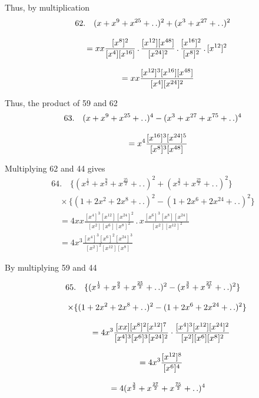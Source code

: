 Thus, by multiplication
\[
\begin{gathered}
62.\quad{}
(x+x^9+x^{25}+\mathinner{.\,.})^2+(x^3+x^{27}+ .\,. )^2\\[8pt]
\quad=xx\frac{[x^8]^2}{[x^4][x^{16}]}\,.\,\frac{[x^{12}][x^{48}]}{[x^{24}]^2}\,.\,\frac{[x^{16}]^2}{[x^8]^2}\,.\,[x^{12}]^2
\\[8pt]\quad{}=xx\frac{[x^{12}]^3[x^{16}][x^{48}]}{[x^4][x^{24}]^2}
\end{gathered}
\]


Thus, the product of 59 and 62
\[
\begin{gathered}63.\quad{}
(x+x^9+x^{25}+\mathinner{.\,.})^4-(x^3+x^{27}+x^{75}+\mathinner{.\,.})^4
\\[8pt]\quad{}=x^4\frac{[x^{16}]^3[x^{24}]^5}{[x^8]^3[x^{48}]}\end{gathered}
\]


Multiplying 62 and 44 gives
\[
\begin{gathered}
64.\quad{}
\{(x^{\frac12}+x^{\frac92}+x^{\frac{25}2}+ .\,. )^2+(x^{\frac32}+x^{\frac{27}2}+ .\,. )^2\}\\[8pt]
\quad\times\{(1+2x^2+2x^8+ .\,. )^2-(1+2x^6+2x^{24}+ .\,. )^2\}\\[8pt]
\quad=4xx\frac{[x^4]^3[x^{12}][x^{24}]^2}{[x^2][x^6][x^8]^2}\,.\,x\frac{[x^6]^3[x^8][x^{24}]}{[x^2][x^{12}]^2}
\\[8pt]\quad{}=4x^3\frac{[x^4]^3[x^6]^2[x^{24}]^3}{[x^2]^2[x^{12}][x^8]}
\end{gathered}
\]


By multiplying 59 and 44


\[
\begin{gathered}
65.\quad{}
\{(x^{\frac12}+x^{\frac92}+x^{\frac{25}2}+\mathinner{.\,.})^2
 -(x^{\frac32}+x^{\frac{27}2}+\mathinner{.\,.})^2\}\\[8pt]
\quad\times\{(1+2x^2+2x^8+\mathinner{.\,.})^2
 -(1+2x^6+2x^{24}+\mathinner{.\,.})^2\}\\[8pt]
\qquad=4x^3\frac{[xx][x^8]^2[x^{12}]^7}{[x^4]^3[x^6]^3[x^{24}]^2}
 \cdot\frac{[x^4]^3[x^{12}][x^{24}]^2}{[x^2][x^6][x^8]^2}\\[8pt]
\qquad=4x^3\frac{[x^{12}]^8}{[x^6]^4}
 \\[8pt]\quad{}=4(x^{\frac32}+x^{\frac{27}2}+x^{\frac{75}2}+\mathinner{.\,.})^4
\end{gathered}
\]

